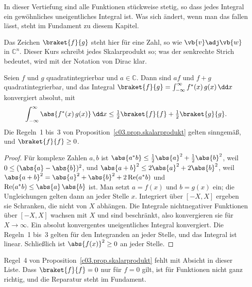 \begin{vertiefung}
  In dieser Vertiefung sind alle Funktionen stückweise stetig, so dass jedes Integral ein
  gewöhnliches uneigentliches Integral ist. Was sich ändert, wenn man das fallen lässt,
  steht im Fundament zu diesem Kapitel.


  Das Zeichen $\braket{f}{g}$ steht hier für eine Zahl, so wie $\vb{v}\adj\vb{w}$ in
  $\mathbb{C}^n$. Dieser Kurs schreibt jedes Skalarprodukt so; was der senkrechte Strich
  bedeutet, wird mit der Notation von Dirac klar.

  \begin{proposition}\label{c03.prop.ltwo}
    Seien $f$ und $g$ quadratintegrierbar und $a \in \mathbb{C}$. Dann sind $af$ und
    $f + g$ quadratintegrierbar, und das Integral
    $\braket{f}{g} = \int_{-\infty}^{\infty} f^*(x)\, g(x)\, \dd x$ konvergiert absolut, mit
    \begin{equation}\label{c03.eq.ltwo}
      \int_{-\infty}^{\infty} \abs{f^*(x)\, g(x)}\, \dd x
      \leq \tfrac12 \braket{f}{f} + \tfrac12 \braket{g}{g} .
    \end{equation}
    Die Regeln~1 bis~3 von Proposition~\ref{c03.prop.skalarprodukt} gelten sinngemäß, und
    $\braket{f}{f} \geq 0$.
  \end{proposition}
  \begin{proof}
    Für komplexe Zahlen $a, b$ ist $\abs{a^* b} \leq \tfrac12 \abs{a}^2 + \tfrac12 \abs{b}^2$,
    weil $0 \leq (\abs{a} - \abs{b})^2$, und $\abs{a + b}^2 \leq 2\abs{a}^2 + 2\abs{b}^2$, weil
    $\abs{a + b}^2 = \abs{a}^2 + \abs{b}^2 + 2 \operatorname{Re}(a^* b)$ und
    $\operatorname{Re}(a^* b) \leq \abs{a}\,\abs{b}$ ist. Man setzt $a = f(x)$ und $b = g(x)$
    ein; die Ungleichungen gelten dann an jeder Stelle $x$. Integriert über $[-X, X]$ ergeben sie Schranken, die
    nicht von $X$ abhängen. Die Integrale nichtnegativer Funktionen über $[-X, X]$ wachsen
    mit $X$ und sind beschränkt, also konvergieren sie für $X \to \infty$. Ein absolut
    konvergentes uneigentliches Integral konvergiert. Die Regeln~1 bis~3 gelten für den
    Integranden an jeder Stelle, und das Integral ist linear. Schließlich ist
    $\abs{f(x)}^2 \geq 0$ an jeder Stelle.
  \end{proof}

  Regel~4 von Proposition~\ref{c03.prop.skalarprodukt} fehlt mit Absicht in dieser Liste.
  Dass $\braket{f}{f} = 0$ nur für $f = 0$ gilt, ist für Funktionen nicht ganz richtig, und
  die Reparatur steht im Fundament.


\end{vertiefung}
